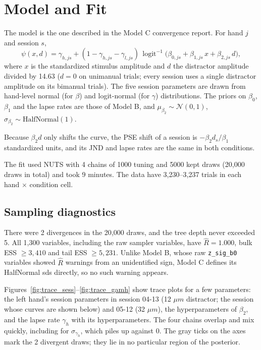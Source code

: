 \documentclass[11pt]{article}
\newcommand{\invlogit}{\operatorname{logit}^{-1}}
\newcommand{\code}[1]{\texttt{#1}}
\begin{document}
\section{Model and Fit}

The model is the one described in the Model C convergence report. For hand $j$ and
session $s$,
\[
  \psi(x, d) = \gamma_{h,js} + (1 - \gamma_{h,js} - \gamma_{l,js})\,
  \invlogit\big(\beta_{0,js} + \beta_{1,js}\, x + \beta_{2,js}\, d\big),
\]
where $x$ is the standardized stimulus amplitude and $d$ the distractor amplitude
divided by 14.63 ($d = 0$ on unimanual trials; every session uses a single distractor
amplitude on its bimanual trials). The five session parameters are drawn from
hand-level normal (for $\beta$) and logit-normal (for $\gamma$) distributions. The
priors on $\beta_0$, $\beta_1$ and the lapse rates are those of Model B, and
$\mu_{\beta_2} \sim \mathcal{N}(0, 1)$, $\sigma_{\beta_2} \sim \text{HalfNormal}(1)$.

Because $\beta_2 d$ only shifts the curve, the PSE shift of a session is
$-\beta_2 d_s / \beta_1$ standardized units, and its JND and lapse rates are the same
in both conditions.

The fit used NUTS with 4 chains of 1000 tuning and 5000 kept draws (20{,}000 draws in
total) and took 9 minutes. The data have 3{,}230--3{,}237 trials in each hand
$\times$ condition cell.

\subsection{Sampling diagnostics}

There were 2 divergences in the 20{,}000 draws, and the tree depth never exceeded 5.
All 1{,}300 variables, including the raw sampler variables, have $\hat{R} = 1.000$,
bulk ESS $\ge 3{,}410$ and tail ESS $\ge 5{,}231$. Unlike Model B, whose raw
\code{z\_sig\_b0} variables showed $\hat{R}$ warnings from an unidentified sign,
Model C defines its HalfNormal sds directly, so no such warning appears.

Figures~\ref{fig:trace_sess}--\ref{fig:trace_gamh} show trace plots for a few
parameters: the left hand's session parameters in session 04-13 (12 $\mu m$
distractor; the session whose curves are shown below) and 05-12 (32 $\mu m$), the
hyperparameters of $\beta_2$, and the lapse rate $\gamma_h$ with its hyperparameters.
The four chains overlap and mix quickly, including for $\sigma_{\gamma_h}$, which
piles up against 0. The gray ticks on the axes mark the 2 divergent draws; they lie
in no particular region of the posterior.
\end{document}
